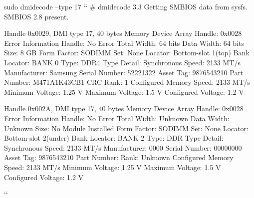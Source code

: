 \documentclass[]{article}
\begin{document}
\begin{ubuntu}
sudo dmidecode --type 17 `\StartConsole`
# dmidecode 3.3
Getting SMBIOS data from sysfs.
SMBIOS 2.8 present.

Handle 0x0029, DMI type 17, 40 bytes
Memory Device
	Array Handle: 0x0028
	Error Information Handle: No Error
	Total Width: 64 bits
	Data Width: 64 bits
	Size: 8 GB
	Form Factor: SODIMM
	Set: None
	Locator: Bottom-slot 1(top)
	Bank Locator: BANK 0
	Type: DDR4
	Type Detail: Synchronous
	Speed: 2133 MT/s
	Manufacturer: Samsung
	Serial Number: 52221322
	Asset Tag: 9876543210
	Part Number: M471A1K43CB1-CRC    
	Rank: 1
	Configured Memory Speed: 2133 MT/s
	Minimum Voltage: 1.25 V
	Maximum Voltage: 1.5 V
	Configured Voltage: 1.2 V

Handle 0x002A, DMI type 17, 40 bytes
Memory Device
	Array Handle: 0x0028
	Error Information Handle: No Error
	Total Width: Unknown
	Data Width: Unknown
	Size: No Module Installed
	Form Factor: SODIMM
	Set: None
	Locator: Bottom-slot 2(under)
	Bank Locator: BANK 2
	Type: DDR
	Type Detail: Synchronous
	Speed: 2133 MT/s
	Manufacturer: 0000
	Serial Number: 00000000
	Asset Tag: 9876543210
	Part Number:                     
	Rank: Unknown
	Configured Memory Speed: 2133 MT/s
	Minimum Voltage: 1.25 V
	Maximum Voltage: 1.5 V
	Configured Voltage: 1.2 V

``
\end{ubuntu}
\end{document}
